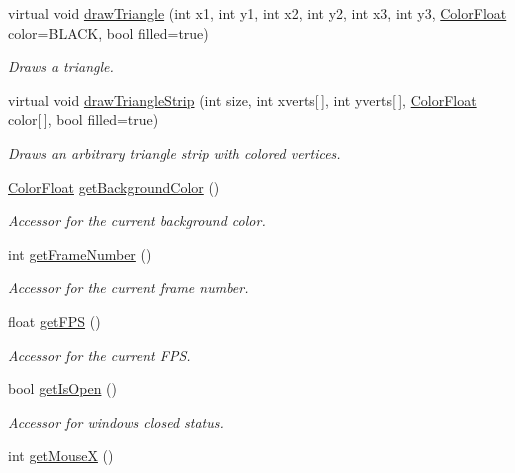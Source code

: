 \begin{DoxyCompactItemize}
virtual void \hyperlink{classtsgl_1_1_canvas_a8abc9ed7d3c55c5d701009040c65000e}{draw\+Triangle} (int x1, int y1, int x2, int y2, int x3, int y3, \hyperlink{structtsgl_1_1_color_float}{Color\+Float} color=B\+L\+A\+C\+K, bool filled=true)
\begin{DoxyCompactList}\small\item\em Draws a triangle. \end{DoxyCompactList}\item 
virtual void \hyperlink{classtsgl_1_1_canvas_a8f570c258a8900178190ec15ac074a57}{draw\+Triangle\+Strip} (int size, int xverts\mbox{[}$\,$\mbox{]}, int yverts\mbox{[}$\,$\mbox{]}, \hyperlink{structtsgl_1_1_color_float}{Color\+Float} color\mbox{[}$\,$\mbox{]}, bool filled=true)
\begin{DoxyCompactList}\small\item\em Draws an arbitrary triangle strip with colored vertices. \end{DoxyCompactList}\item 
\hyperlink{structtsgl_1_1_color_float}{Color\+Float} \hyperlink{classtsgl_1_1_canvas_a2b39e50888d61e88527a66ac0f6ac880}{get\+Background\+Color} ()
\begin{DoxyCompactList}\small\item\em Accessor for the current background color. \end{DoxyCompactList}\item 
int \hyperlink{classtsgl_1_1_canvas_af4f8f2b1abd27316a4a39ae097407d37}{get\+Frame\+Number} ()
\begin{DoxyCompactList}\small\item\em Accessor for the current frame number. \end{DoxyCompactList}\item 
float \hyperlink{classtsgl_1_1_canvas_a1c8ac321138948650a3006f325dfb886}{get\+F\+P\+S} ()
\begin{DoxyCompactList}\small\item\em Accessor for the current F\+P\+S. \end{DoxyCompactList}\item 
bool \hyperlink{classtsgl_1_1_canvas_aa933363de2d19ec516603a2ed3b4f817}{get\+Is\+Open} ()
\begin{DoxyCompactList}\small\item\em Accessor for window\textquotesingle{}s closed status. \end{DoxyCompactList}\item 
int \hyperlink{classtsgl_1_1_canvas_a4af9bed83746f998474039185d2a765a}{get\+Mouse\+X} ()

\end{DoxyCompactItemize}
